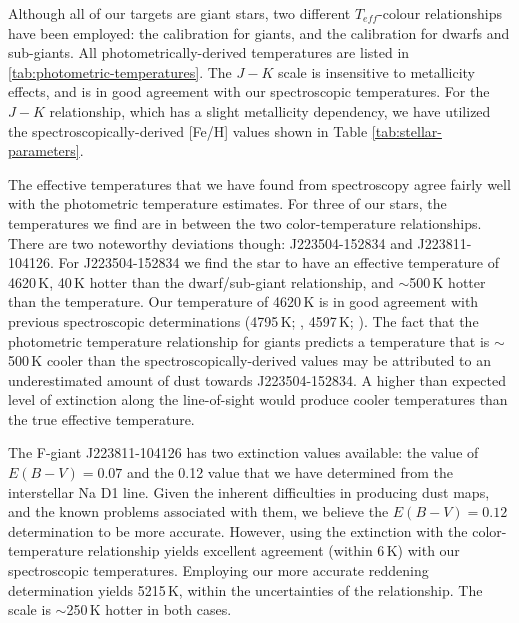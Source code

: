 \documentclass{emulateapj}
\begin{document}
Although all of our targets are giant stars, two different $T_{eff}$-colour relationships have been employed: the \citet{alonso;et-al_1999} calibration for giants, and the \citet{casagrande;et-al_2010} calibration for dwarfs and sub-giants. All photometrically-derived temperatures are listed in \ref{tab:photometric-temperatures}. The \citet{alonso;et-al_1999} $J-K$ scale is insensitive to metallicity effects, and is in good agreement with our spectroscopic temperatures. For the \citet{casagrande;et-al_2010} $J-K$ relationship, which has a slight metallicity dependency, we have utilized the spectroscopically-derived [Fe/H] values shown in Table \ref{tab:stellar-parameters}.

The effective temperatures that we have found from spectroscopy agree fairly well with the photometric temperature estimates. For three of our stars, the temperatures we find are in between the two color-temperature relationships. There are two noteworthy deviations though: J223504-152834 and J223811-104126. For J223504-152834 we find the star to have an effective temperature of 4620\,K, 40\,K hotter than the \citet{casagrande;et-al_2010} dwarf/sub-giant relationship, and ${\sim}$500\,K hotter than the \citet{alonso;et-al_1999} temperature. Our temperature of 4620\,K is in good agreement with previous spectroscopic determinations (4795\,K; \citet{williams;et-al_2011}, 4597\,K; \citet{wylie-de-boer;et-al_2012}). The fact that the \citet{alonso;et-al_1999} photometric temperature relationship for giants predicts a temperature that is ${\sim}$500\,K cooler than the spectroscopically-derived values may be attributed to an underestimated amount of dust towards J223504-152834. A higher than expected level of extinction along the line-of-sight would produce cooler temperatures than the true effective temperature. 

The F-giant J223811-104126 has two extinction values available: the \citet{schlegel;et-al_1998} value of $E(B-V) = 0.07$ and the 0.12 value that we have determined from the interstellar Na D1 line. Given the inherent difficulties in producing dust maps, and the known problems associated with them, we believe the $E(B-V) = 0.12$ determination to be more accurate. However, using the \citet{schlegel;et-al_1998} extinction with the \citet{alonso;et-al_1999} color-temperature relationship yields excellent agreement (within 6\,K) with our spectroscopic temperatures. Employing our more accurate reddening determination yields 5215\,K, within the uncertainties of the relationship. The \citet{casagrande;et-al_2010} scale is ${\sim}$250\,K hotter in both cases.
\end{document}

